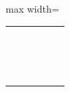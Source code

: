 \begin{exercise}
\begin{table}[H]
\begin{adjustbox}{max width=\textwidth}
\begin{tabular}{|l|l|l|l|l|l|}
                 & & & & & \\
                 & & & & & \\
                 & & & & & \\
                 & & & & & \\
                 & & & & & \\
                 & & & & & \\
                 & & & & & \\
                 & & & & & \\
                 & & & & & \\
                 & & & & & \\
                 & & & & & \\
                 & & & & & \\
                 & & & & & \\
                 & & & & & \\
                 & & & & & \\
                 & & & & & \\
                \bottomrule
            \end{tabular}
        \end{adjustbox}
    \end{table}
\end{exercise}

